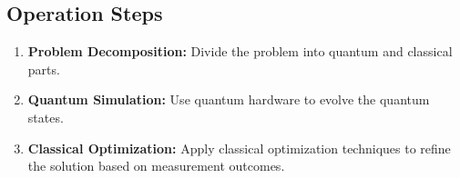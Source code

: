 \documentclass{article}
\begin{document}
\subsection{Operation Steps}
\begin{enumerate}
    \item \textbf{Problem Decomposition:} Divide the problem into quantum and classical parts.
    \item \textbf{Quantum Simulation:} Use quantum hardware to evolve the quantum states.
    \item \textbf{Classical Optimization:} Apply classical optimization techniques to refine the solution based on measurement outcomes.
\end{enumerate}
\end{document}
